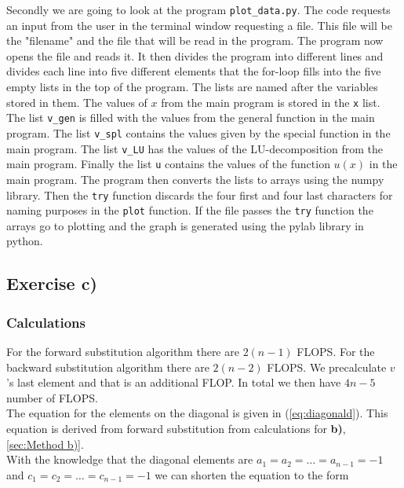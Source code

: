 \documentclass{article}
\begin{document}
    Secondly we are going to look at the program \texttt{plot\_data.py}. The code requests an input from the user in the terminal window requesting a file. This file will be the "filename" and the file that will be read in the program. The program now opens the file and reads it. It then divides the program into different lines and divides each line into five different elements that the for-loop fills into the five empty lists in the top of the program. The lists are named after the variables stored in them. The values of $x$ from the main program is stored in the \texttt{x} list. The list \texttt{v\_gen} is filled with the values from the general function in the main program. The list \texttt{v\_spl} contains the values given by the special function in the main program. The list \texttt{v\_LU} has the values of the LU-decomposition from the main program. Finally the list \texttt{u} contains the values of the function $u(x)$ in the main program. The program then converts the lists to arrays using the numpy library. Then the \texttt{try} function discards the four first and four last characters for naming purposes in the \texttt{plot} function. If the file passes the \texttt{try} function the arrays go to plotting and the graph is generated using the pylab library in python.


\subsection{Exercise c)} \label{sec:Method c)}

  \subsubsection{Calculations}

    For the forward substitution algorithm there are $2(n-1)$ FLOPS. For the backward substitution algorithm there are $2(n-2)$ FLOPS. We precalculate $v$'s last element and that is an additional FLOP. In total we then have $4n - 5$ number of FLOPS. \\

    The equation for the elements on the diagonal is given in (\ref{eq:diagonald}). This equation is derived from forward substitution from calculations for \textbf{b)}, \ref{sec:Method b)}. \\

    With the knowledge that the diagonal elements are $a_1 = a_2 = \hdots = a_{n-1} = -1 $ and $c_1 = c_2 = \hdots = c_{n-1} = -1$ we can shorten the equation to the form
\end{document}
